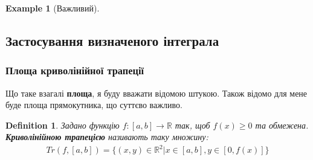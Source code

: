 \documentclass[a4paper, 10pt]{article}
\theoremstyle{theoremdd}
\theoremstyle{theoremdd}
\theoremstyle{theoremdd}
\newtheorem{definition}[theorem]{Definition}
\theoremstyle{theoremdd}
\theoremstyle{theoremdd}
\newtheorem{example}[theorem]{Example}
\theoremstyle{theoremdd}
\theoremstyle{theoremdd}
\theoremstyle{theoremdd}
\theoremstyle{theoremdd}
\begin{document}
\begin{example}[Важливий]

\end{example}

\subsection{Застосування визначеного інтеграла}
\subsubsection{Площа криволінійної трапеції}
Що таке взагалі \textbf{площа}, я буду вважати відомою штукою. Також відомо для мене буде площа прямокутника, що суттєво важливо.

\begin{definition}
Задано функцію $f: [a,b] \to \mathbb{R}$ так, щоб $f(x) \geq 0$ та обмежена.\\
\textbf{Криволінійною трапецією} називають таку множину:
\begin{align*}
Tr(f,[a,b]) = \{(x,y) \in \mathbb{R}^2 | x \in [a,b], y \in [0, f(x)] \}
\end{align*}
\begin{figure}[H]
\centering
{}
\end{figure}
\end{definition}
\end{document}
